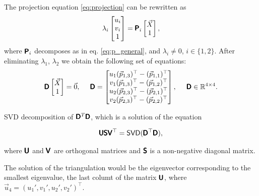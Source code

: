 The projection equation \eqref{eq:projection} can be rewritten as
\begin{equation}
    \lambda_i \begin{bmatrix} 
        u_i \\ v_i \\ 1 \end{bmatrix} = \pmb{\mathsf{P}}_i
    \begin{bmatrix} \vec{X} \\ 1
    \end{bmatrix},
\end{equation} 
where $\pmb{\mathsf{P}}_i$ decomposes as in eq. \eqref{eq:p_general}, and $\lambda_i \neq 0$, $i \in \{1, 2\}$.
After eliminating $\lambda_1$, $\lambda_2$ we obtain the following set of equations:
\begin{equation}
    \pmb{\mathsf{D}} \begin{bmatrix} \vec{X} \\ 1 \end{bmatrix} = \vec{0}, \;\;\;\;\;
    \pmb{\mathsf{D}} = \begin{bmatrix}
        u_1 (\vec{p}_{1, 3})^\top - (\vec{p}_{1, 1})^\top \\
        v_1 (\vec{p}_{1, 3})^\top - (\vec{p}_{1, 2})^\top \\
        u_2 (\vec{p}_{2, 3})^\top - (\vec{p}_{2, 1})^\top \\
        v_2 (\vec{p}_{2, 3})^\top - (\vec{p}_{2, 2})^\top \\
    \end{bmatrix}, \;\;\;\;\; \pmb{\mathsf{D}} \in \mathbb{R}^{4 \times 4}.
\end{equation}


SVD decomposition of $\pmb{\mathsf{D}}^T\pmb{\mathsf{D}}$, which is a solution of the equation

\begin{equation}
    \pmb{\mathsf{U}}\pmb{\mathsf{S}}\pmb{\mathsf{V}}^\top = \mathsf{SVD}(\pmb{\mathsf{D}}^\top\pmb{\mathsf{D}}),
\end{equation}

where $\pmb{\mathsf{U}}$ and $\pmb{\mathsf{V}}$ are orthogonal matrices and $\pmb{\mathsf{S}}$ is a non-negative diagonal matrix.

The solution of the triangulation would be the eigenvector corresponding to the smallest eigenvalue, the last columt of the matrix $\pmb{\mathsf{U}}$, where $\vec{u}_4 = (u_1', v_1', u_2', v_2')^\top$.




